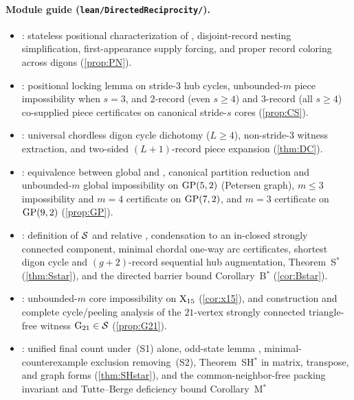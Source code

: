 \paragraph{Module guide (\texttt{lean/DirectedReciprocity/}).}
\begin{itemize}[leftmargin=2em]
\item {}: stateless positional characterization of , disjoint-record
  nesting simplification, first-appearance supply forcing, and proper record coloring across digons (\cref{prop:PN}).
\item {}: positional locking lemma on stride-$3$ hub cycles, unbounded-$m$ piece impossibility
  when $s = 3$, and $2$-record (even $s \ge 4$) and $3$-record (all $s \ge 4$) co-supplied piece certificates on canonical
  stride-$s$ cores (\cref{prop:CS}).
\item {}: universal chordless digon cycle dichotomy ($L \ge 4$), non-stride-$3$ witness extraction,
  and two-sided $(L+1)$-record piece expansion (\cref{thm:DC}).
\item {}: equivalence between global  and ,
  canonical partition reduction and unbounded-$m$ global impossibility on $\operatorname{GP}(5,2)$ (Petersen graph), $m \le 3$
  impossibility and $m = 4$ certificate on $\operatorname{GP}(7,2)$, and $m = 3$ certificate on $\operatorname{GP}(9,2)$ (\cref{prop:GP}).
\item {}: definition of $\mathcal{S}$ and relative , condensation to an in-closed strongly
  connected component, minimal chordal one-way arc certificates, shortest digon cycle and $(g+2)$-record sequential hub
  augmentation, Theorem~S$^*$ (\cref{thm:Sstar}), and the directed barrier bound Corollary~B$^*$ (\cref{cor:Bstar}).
\item {}: unbounded-$m$ core impossibility on $\mathrm{X}_{15}$ (\cref{cor:x15}), and construction and
  complete cycle/peeling analysis of the $21$-vertex strongly connected triangle-free witness $\mathrm{G}_{21} \in \mathcal{S}$
  (\cref{prop:G21}).
\item {}: unified final count  under~(S1) alone, odd-state lemma ,
  minimal-counterexample exclusion removing~(S2), Theorem~SH$^*$ in matrix, transpose, and graph forms (\cref{thm:SHstar}),
  and the common-neighbor-free packing invariant  and Tutte--Berge deficiency bound Corollary~M$^*$

\end{itemize}
